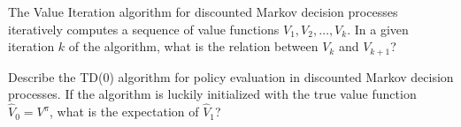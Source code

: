 \documentclass[11pt]{article}
\newcounter{marks}
\begin{document}
\begin{list}{{\bf Question :}}
\framebox[16cm][l]{ 
\parbox{15.9cm}{
\vspace*{4.5cm}
}}

\item
{}
\addtocounter{marks}{1}
The Value Iteration algorithm for discounted Markov decision processes iteratively computes a sequence of value functions $V_1,V_2,\dots,V_k$. In a given iteration $k$ of the algorithm, what is the relation between $V_{k}$ and $V_{k+1}$?

\framebox[16cm][l]{ 
\parbox{15.9cm}{
\vspace*{5cm}
}}

\item
{}
\addtocounter{marks}{2}
Describe the TD(0) algorithm for policy evaluation in discounted Markov decision processes. If the algorithm is luckily initialized with the true value function $\widehat{V}_0 = V^\pi$, what is the expectation of $\widehat{V}_1$?

\framebox[16cm][l]{ 
\parbox{15.9cm}{
\vspace*{7.5cm}
}}


\end{list}
\end{document}
